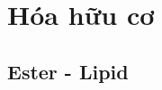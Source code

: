 \documentclass[Main.tex]{subfiles}
\begin{document}
\setcounter{secnumdepth}{4}
\titlespacing*{\subsubsection}{0cm}{0pt}{0pt}
\part{Hóa hữu cơ}
\chapter{Ester - Lipid}

\end{document}
